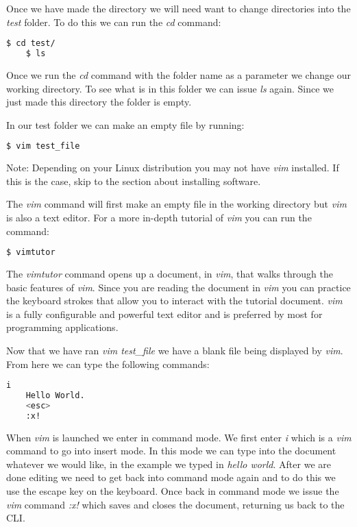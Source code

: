 Once we have made the directory we will need want to change directories into the \emph{test} folder. To do this we can run the \emph{cd} command:

\begin{lstlisting}[language=bash]  
    $ cd test/
	$ ls
\end{lstlisting}

Once we run the \emph{cd} command with the folder name as a parameter we change our working directory. To see what is in this folder we can issue \emph{ls} again. Since we just made this directory the folder is empty. 

In our test folder we can make an empty file by running:

\begin{lstlisting}[language=bash] 
    $ vim test_file
\end{lstlisting}

Note: Depending on your Linux distribution you may not have \emph{vim} installed. If this is the case, skip to the section about installing software.

The \emph{vim} command will first make an empty file in the working directory but \emph{vim} is also a text editor. For a more in-depth tutorial of \emph{vim} you can run the command:

\begin{lstlisting}[language=bash]  
    $ vimtutor
\end{lstlisting}

The \emph{vimtutor} command opens up a document, in \emph{vim}, that walks through the basic features of \emph{vim}. Since you are reading the document in \emph{vim} you can practice the keyboard strokes that allow you to interact with the tutorial document. \emph{vim} is a fully configurable and powerful text editor and is preferred by most for programming applications. 

Now that we have ran \emph{vim test\_file} we have a blank file being displayed by \emph{vim}. From here we can type the following commands:

\begin{lstlisting}[language=bash]
    i
    Hello World.
    <esc>
    :x!
\end{lstlisting}

When \emph{vim} is launched we enter in command mode. We first enter \emph{i} which is a \emph{vim} command to go into insert mode. In this mode we can type into the document whatever we would like, in the example we typed in \emph{hello world}. After we are done editing we need to get back into command mode again and to do this we use the escape key on the keyboard. Once back in command mode we issue the \emph{vim} command \emph{:x!} which saves and closes the document, returning us back to the \ac{CLI}.	
	
